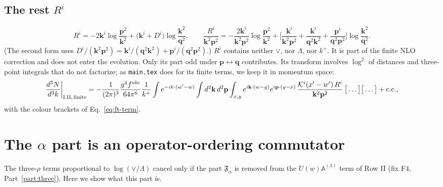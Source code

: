 \documentclass[10pt]{article}
\numberwithin{equation}{section}
\newcommand{\KK}{\mathcal K}
\newcommand{\bk}{\mathbf k}
\newcommand{\bp}{\mathbf p}
\newcommand{\bq}{\mathbf q}
\begin{document}
\subsection{The rest \texorpdfstring{$R^i$}{R}}\label{sec:ft-rest}
\begin{equation}
R^i=-2\bk^i\log\frac{\bp^2}{\bk^2}+\big(\bk^i+D^i\big)\log\frac{\bk^2}{\bq^2},\qquad
\frac{R^i}{\bk^2\bp^2}=-\frac{2\bk^i}{\bk^2\bp^2}\log\frac{\bp^2}{\bk^2}+\Big[\frac{\bk^i}{\bk^2\bp^2}+\frac{\bk^i}{\bq^2\bk^2}+\frac{\bp^i}{\bq^2\bp^2}\Big]\log\frac{\bk^2}{\bq^2}.
\end{equation}
(The second form uses $D^i/(\bk^2\bp^2)=\bk^i/(\bq^2\bk^2)+\bp^i/(\bq^2\bp^2)$.) $R^i$ contains neither $\vee$, nor $\Lambda$, nor $k^+$. It is part of the finite NLO correction and does not enter the evolution. Only its part odd under $\bp\leftrightarrow\bq$ contributes. Its transform involves $\log^2$ of distances and three-point integrals that do not factorize; as \texttt{main.tex} does for its finite terms, we keep it in momentum space:
\begin{equation}
\frac{d^3N}{d^3k}\bigg|_{\rm I.II,\,finite}=-\frac{1}{(2\pi)^3}\frac{g^4f^{abc}}{64\pi^6}\frac1{k^+}\int e^{-ik\cdot(w'-w)}\int d^2\bk\,d^2\bp\int_{x,y}e^{i\bk\cdot(w-y)}e^{i\bp\cdot(y-x)}\,\frac{\KK^i(x'-w')\,R^i}{\bk^2\bp^2}\,\big[\dots\big]\big[\dots\big]+{\rm c.c.},
\end{equation}
with the colour brackets of Eq.~\eqref{eq:ft-term}.

\section{The \texorpdfstring{$\alpha$}{alpha} part is an operator-ordering commutator}\label{sec:alpha}
The three-$\rho$ terms proportional to $\log(\vee/\Lambda)$ cancel only if the part $\mathfrak F_\alpha$ is removed from the $U(w)\mathbb A^{(3)}$ term of Row II (fix F4, Part~\ref{part:three}). Here we show what this part is.
\end{document}
